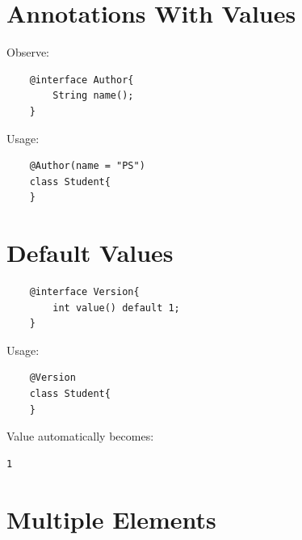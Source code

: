 \documentclass[11pt,a4paper]{book}
\begin{document}

\section{Annotations With Values}

Observe:

\begin{verbatim} 
    @interface Author{
        String name();
    }
\end{verbatim}


Usage:

\begin{verbatim} 
    @Author(name = "PS")
    class Student{
    }
\end{verbatim}



\section{Default Values}

\begin{verbatim} 
    @interface Version{
        int value() default 1;
    }
\end{verbatim}


Usage:

\begin{verbatim} 
    @Version
    class Student{
    }
\end{verbatim}


Value automatically becomes:

\begin{verbatim} 
1
\end{verbatim}


\section{Multiple Elements}
\end{document}
